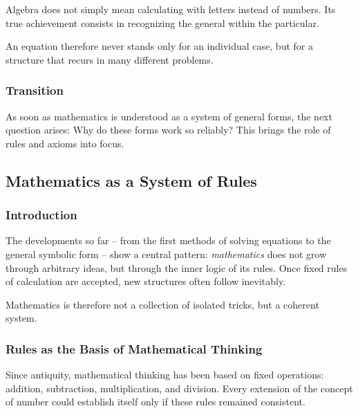 \begin{DidacticBox}
	\label{box:generalform}
	Algebra does not simply mean
	calculating with letters instead of numbers.
	Its true achievement consists in recognizing
	the general within the particular.
	
	An equation therefore never stands only for an individual case,
	but for a structure
	that recurs in many different problems.
\end{DidacticBox}

\subsubsection*{Transition}
As soon as mathematics is understood as a system of general forms,
the next question arises:
Why do these forms work so reliably?
This brings the role of rules and axioms into focus.


\subsection{Mathematics as a System of Rules}
\label{sec:3.5_system_of_rules}

\subsubsection*{Introduction}
The developments so far -- from the first methods of solving equations
to the general symbolic form --
show a central pattern:
\emph{mathematics}
does not grow through arbitrary ideas,
but through the inner logic of its rules.
Once fixed rules of calculation are accepted,
new structures often follow inevitably.

Mathematics is therefore not a collection of isolated tricks,
but a coherent system.

\subsubsection*{Rules as the Basis of Mathematical Thinking}
Since antiquity,
mathematical thinking has been based on fixed operations:
addition, subtraction,
multiplication, and division.
Every extension of the concept of number
could establish itself only if these rules remained consistent.

